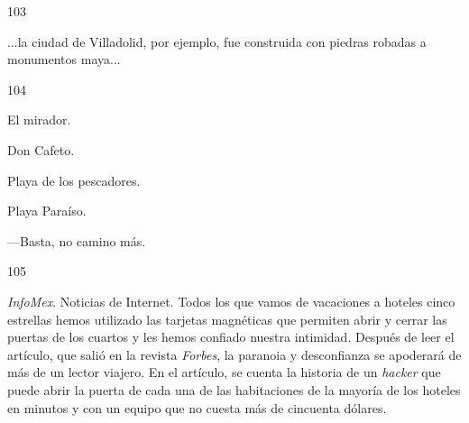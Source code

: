 \documentclass[12pt,twoside,openright,a5paper]{book}
\begin{document}
\vspace{0.5cm}

\hrulefill \hspace{0.1cm}\decofourleft\hspace{0.2cm} 103 \hspace{0.2cm}\decofourright \hspace{0.1cm}\hrulefill

\nopagebreak

\vspace{0.5cm}

\nopagebreak

...la ciudad de Villadolid, por ejemplo,
fue construida con piedras robadas a monumentos maya...


\vspace{0.5cm}

\hrulefill \hspace{0.1cm}\decofourleft\hspace{0.2cm} 104 \hspace{0.2cm}\decofourright \hspace{0.1cm}\hrulefill

\nopagebreak

\vspace{0.5cm}

\nopagebreak

El mirador.

Don Cafeto.

Playa de los pescadores.

Playa Paraíso.

---Basta, no camino más.

\vspace{0.5cm}
\afterpage{}
\hrulefill \hspace{0.1cm}\decofourleft\hspace{0.2cm} 105 \hspace{0.2cm}\decofourright \hspace{0.1cm}\hrulefill

\nopagebreak

\vspace{0.5cm}

\nopagebreak

\emph{InfoMex}. Noticias de Internet. Todos los que vamos de vacaciones a hoteles
cinco estrellas hemos utilizado las tarjetas magnéticas que permiten
abrir y cerrar las puertas de los cuartos y les hemos confiado nuestra
intimidad. Después de leer el artículo, que salió en la revista \emph{Forbes},
la paranoia y desconfianza se apoderará de más de un lector viajero. En
el artículo, se cuenta la historia de un \emph{hacker} que puede abrir la puerta
de cada una de las habitaciones de la mayoría de los hoteles en minutos
y con un equipo que no cuesta más de cincuenta dólares.
\end{document}
